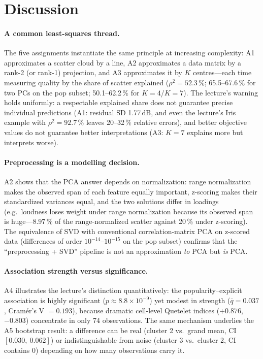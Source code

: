 \documentclass[11pt,letterpaper]{article}
\begin{document}
\section{Discussion}\label{sec:disc}

\paragraph{A common least-squares thread.} The five assignments instantiate
the same principle at increasing complexity: A1 approximates a scatter cloud
by a line, A2 approximates a data matrix by a rank-2 (or rank-1) projection,
and A3 approximates it by $K$ centres---each time measuring quality by the
share of scatter explained ($\rho^2 = 52.3\,\%$; 65.5--67.6\,\% for two PCs
on the pop subset; 50.1--62.2\,\% for $K=4$/$K=7$). The lecture's warning
holds uniformly: a respectable explained
share does not guarantee precise individual predictions (A1: residual SD
1.77\,dB, and even the lecture's Iris example with $\rho^2 = 92.7\,\%$ leaves
20--32\,\% relative errors), and better objective values do not guarantee
better interpretations (A3: $K=7$ explains more but interprets worse).

\paragraph{Preprocessing is a modelling decision.} A2 shows that the PCA
answer depends on normalization: range normalization makes the observed span
of each feature equally important, z-scoring makes their standardized variances
equal, and the two solutions differ in loadings (e.g.\ loudness loses weight
under range normalization because its observed span is huge---8.97\,\% of the
range-normalized scatter against 20\,\% under z-scoring). The equivalence
of SVD with conventional correlation-matrix PCA on z-scored data (differences
of order $10^{-14}$--$10^{-15}$ on the pop subset) confirms that the
``preprocessing + SVD'' pipeline is not an
approximation \emph{to} PCA but \emph{is} PCA.

\paragraph{Association strength versus significance.} A4 illustrates the
lecture's distinction quantitatively: the popularity--explicit association is
highly significant ($p \approx 8.8\times10^{-9}$) yet modest in strength
($\bar q = 0.037$, Cram\'er's V $= 0.193$), because dramatic cell-level
Quetelet indices ($+0.876$, $-0.803$) concentrate in only 74 observations.
The same mechanism underlies the A5 bootstrap result: a difference can be
real (cluster 2 vs.\ grand mean, CI $[0.030,\ 0.062]$) or indistinguishable
from noise (cluster 3 vs.\ cluster 2, CI contains 0) depending on how many
observations carry it.
\end{document}
